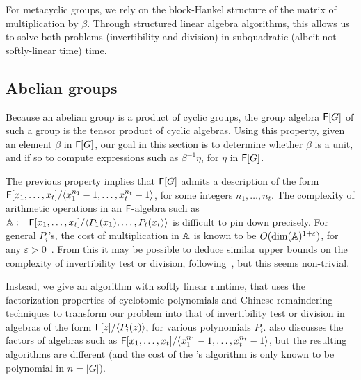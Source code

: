 For metacyclic groups, we rely on the block-Hankel structure of the
matrix of multiplication by $\beta$. Through structured linear algebra
algorithms, this allows us to solve both problems (invertibility and
division) in subquadratic (albeit not softly-linear time) time.


\subsection{Abelian groups}

Because an abelian group is a product of cyclic groups, the group
algebra ${\mathsf{F}}[G]$ of such a group is the tensor product of cyclic
algebras. Using this property, given an element $\beta$ in ${\mathsf{F}}[G]$,
our goal in this section is to determine whether $\beta$ is a unit,
and if so to compute expressions such as $\beta^{-1} \eta$, for
$\eta$ in ${\mathsf{F}}[G]$.

The previous property implies that ${\mathsf{F}}[G]$ admits a description of the
form ${\mathsf{F}}[x_1,\dots,x_t]/\langle x_1^{n_1}-1,\dots,x_t^{n_t}-1\rangle$,
for some integers $n_1,\dots,n_t$. The complexity of arithmetic
operations in an ${\mathsf{F}}$-algebra such as $\mathbb{A}:={\mathsf{F}}[x_1,\dots,x_t]/\langle
P_1(x_1),\dots,P_t(x_t)\rangle$ is difficult to pin down precisely. For
general $P_i$'s, the cost of multiplication in $\mathbb{A}$ is known to be
$O(\dim(\mathbb{A})^{1+\varepsilon})$, for any $\varepsilon >
0$~\citep[Theorem~2]{LiMoSc09}. From this it may be possible to deduce
similar upper bounds on the complexity of invertibility test or division,
following~\citep{DaMMMScXi06}, but this seems non-trivial.

Instead, we give an algorithm with softly linear runtime, that uses
the factorization properties of cyclotomic polynomials and Chinese
remaindering techniques to transform our problem into that of
invertibility test or division in algebras of the form ${\mathsf{F}}[z]/\langle
P_i(z) \rangle$, for various polynomials $P_i$.  \cite{Pol94} also
discusses the factors of algebras such as ${\mathsf{F}}[x_1,\dots,x_t]/\langle
x_1^{n_1}-1,\dots,x_t^{n_t}-1\rangle$, but the resulting algorithms
are different (and the cost of the \citeauthor{Pol94}'s
\citeyearpar{Pol94} algorithm is only known to be polynomial in
$n=|G|$).

\smallskip

